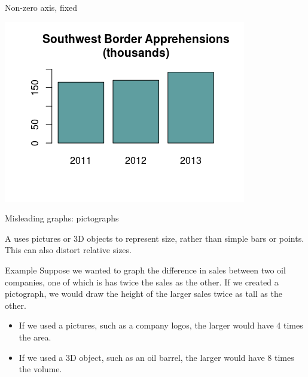 \documentclass{beamer}
\begin{document}
\begin{frame}{Non-zero axis, fixed}
\begin{center}
\includegraphics{../images/ch02_bad_nonzero_fixed} 
\end{center}
\end{frame}

\begin{frame}{Misleading graphs: pictographs}
\begin{block}{}
A  uses pictures or 3D objects to represent size, rather than simple bars or points. This can also distort relative sizes.
\end{block}

\pause
\begin{exampleblock}{Example}
Suppose we wanted to graph the difference in sales between two oil companies, one of which is has twice the sales as the other. If we created a pictograph, we would draw the height of the larger sales twice as tall as the other.
\begin{itemize}
\item If we used a pictures, such as a company logos, the larger would have 4 times the area.
\item If we used a 3D object, such as an oil barrel, the larger would have 8 times the volume. 
\end{itemize}
\end{exampleblock}
\end{frame}
\end{document}
